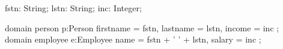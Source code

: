 fstn: String;  lstn: String; inc: Integer;

domain person p:Person {
    firstname = fstn, lastname = lstn, income = inc
};
domain employee e:Employee {
    name = fstn + ' ' + lstn, salary = inc
};